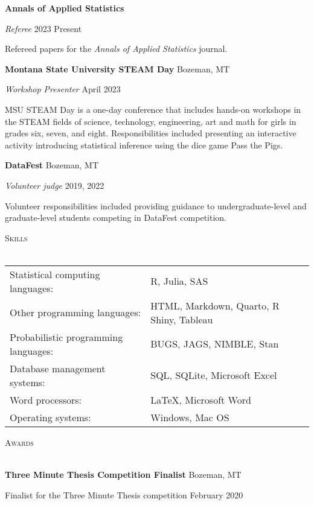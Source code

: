 \documentclass[a4paper]{article}
\newcommand{\lineunder} {
	\vspace*{-8pt} \\
	\hspace*{-18pt} \hrulefill \\
}
\newcommand{\header} [1] {
	{\hspace*{-18pt}\vspace*{6pt} \textsc{#1}}
	\vspace*{-6pt} \lineunder
}
\begin{document}
\textbf{Annals of Applied Statistics}

\emph{Referee} \hfill 2023 \textbar{} Present

Refereed papers for the \emph{Annals of Applied Statistics} journal.
\vspace*{2mm}

\textbf{Montana State University STEAM Day} \hfill Bozeman, MT

\emph{Workshop Presenter} \hfill April 2023

MSU STEAM Day is a one-day conference that includes hands-on workshops
in the STEAM fields of science, technology, engineering, art and math
for girls in grades six, seven, and eight. Responsibilities included
presenting an interactive activity introducing statistical inference
using the dice game Pass the Pigs. \vspace*{2mm}

\textbf{DataFest} \hfill Bozeman, MT

\emph{Volunteer judge} \hfill 2019, 2022

Volunteer responsibilities included providing guidance to
undergraduate-level and graduate-level students competing in DataFest
competition. \vspace*{2mm}

\header{Skills}
\vspace*{2mm}
\begin{tabular}{ l l }
  Statistical computing languages:  & R, Julia, SAS \\
    Other programming languages:         &  HTML, Markdown, Quarto, R Shiny, Tableau \\
  Probabilistic programming languages:         & BUGS, JAGS, NIMBLE, Stan \\
    Database management systems:         & SQL, SQLite, Microsoft Excel \\
    Word processors:       & LaTeX, Microsoft Word \\
    Operating systems:       & Windows, Mac OS \\
\end{tabular}
\vspace*{2mm}

\header{Awards}
\vspace*{2mm}

\textbf{Three Minute Thesis Competition Finalist} \hfill Bozeman, MT

Finalist for the Three Minute Thesis competition \hfill February 2020

\vspace*{2mm}
\end{document}
